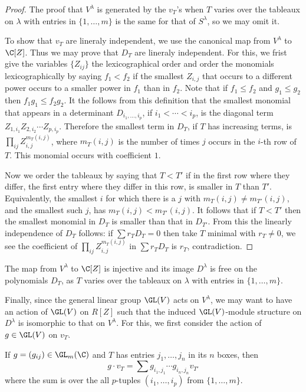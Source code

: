 \begin{proof}
The proof that $V^\lambda$ is generated by the $v_T$'s when $T$ varies over the tableaux on $\lambda$ with entries in $\{1,\dots,m\}$ is the same for that of $S^\lambda$, so we may omit it.\par
To show that $v_T$ are lineraly independent, we use the canonical map from $V^\lambda$ to $\C[Z]$. Thus we may prove that $D_T$ are lineraly independent. For this, we frist give the variables $\{Z_{ij}\}$ the lexicographical order and order the monomials lexicographically by saying $f_1<f_2$ if the smallest $Z_{i,j}$ that occurs to a different power occurs to a smaller power in $f_1$ than in $f_2$. Note that if $f_1\leq f_2$ and $g_1\leq g_2$ then $f_1g_1\leq f_2g_2$. It the follows from this definition that the smallest monomial that appears in a determinant $D_{i_1,\dots,i_p}$, if $i_1<\cdots<i_p$, is the diagonal term $Z_{1,i_1}Z_{2,i_2}\cdots Z_{p,i_p}$. Therefore the smallest term in $D_T$, if $T$ has increasing terms, is $\prod_{ij}Z_{i,j}^{m_T(i,j)}$, where $m_T(i,j)$ is the number of times $j$ occurs in the $i$-th row of $T$. This monomial occurs with coefficient $1$.\par
Now we order the tableaux by saying that $T<T'$ if in the first row where they differ, the first entry where they differ in this row, is smaller in $T$ than $T'$. Equivalently, the smallest $i$ for which there is a $j$ with $m_T(i,j)\neq m_{T'}(i,j)$, and the smallest such $j$, has $m_T(i,j)<m_{T'}(i,j)$. It follows that if $T<T'$ then the smallest monomial in $D_T$ is smaller than that in $D_{T'}$. From this the linearly independence of $D_T$ follows: if $\sum r_TD_T=0$ then take $T$ minimal with $r_T\neq 0$, we see the coefficient of $\prod_{ij}Z_{i,j}^{m_T(i,j)}$ in $\sum r_TD_T$ is $r_T$, contradiction.
\end{proof}
\begin{corollary}
The map from $V^\lambda$ to $\C[Z]$ is injective and its image $D^\lambda$ is free on the polynomials $D_T$, as $T$ varies over the tableaux on $\lambda$ with entries in $\{1,\dots,m\}$.
\end{corollary}
Finally, since the general linear group $\GL(V)$ acts on $V^\lambda$, we may want to have an action of $\GL(V)$ on $R[Z]$ such that the induced $\GL(V)$-module structure on $D^\lambda$ is isomorphic to that on $V^\lambda$. For this, we first consider the action of $g\in\GL(V)$ on $v_T$.
\begin{lemma}
If $g=(g_{ij})\in\GL_m(\C)$ and $T$ has entries $j_1,\dots,j_n$ in its $n$ boxes, then
\[g\cdot v_T=\sum g_{i_1,j_1}\cdots g_{i_n,j_n}v_{T'}\]
where the sum is over the all $p$-tuples $(i_1,\dots,i_p)$ from $\{1,\dots,m\}$.
\end{lemma}
